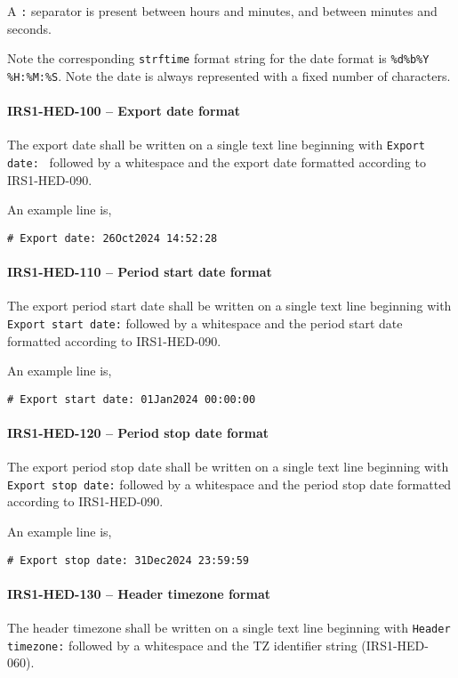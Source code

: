 A \lstinline{:} separator is present between hours and minutes, and between
minutes and seconds.

Note the corresponding \lstinline{strftime} \cite{cpp:strftime} format string
for the date format is \lstinline{%d%b%Y %H:%M:%S}. Note the date is always
represented with a fixed number of characters.

\paragraph{IRS1-HED-100 -- Export date format}
The export date shall be written on a single text line beginning with
\lstinline{Export date: } followed by a whitespace and the export date
formatted according to IRS1-HED-090.

An example line is,
\begin{lstlisting}[numbers=none]
  # Export date: 26Oct2024 14:52:28
\end{lstlisting}

\paragraph{IRS1-HED-110 -- Period start date format}
The export period start date shall be written on a single text line beginning
with \lstinline{Export start date:} followed by a whitespace and the period
start date formatted according to IRS1-HED-090.

An example line is,
\begin{lstlisting}[numbers=none]
  # Export start date: 01Jan2024 00:00:00
\end{lstlisting}

\paragraph{IRS1-HED-120 -- Period stop date format}
The export period stop date shall be written on a single text line beginning
with \lstinline{Export stop date:} followed by a whitespace and the period
stop date formatted according to IRS1-HED-090.

An example line is,
\begin{lstlisting}[numbers=none]
  # Export stop date: 31Dec2024 23:59:59
\end{lstlisting}

\paragraph{IRS1-HED-130 -- Header timezone format}
The header timezone shall be written on a single text line
beginning with \lstinline{Header timezone:} followed by a whitespace
and the TZ identifier string (IRS1-HED-060).

